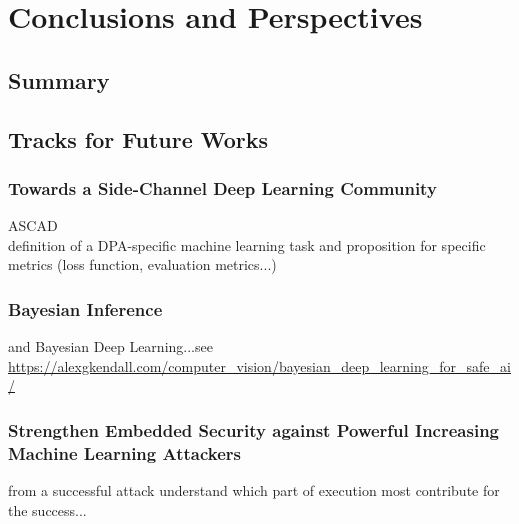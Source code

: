 
\chapter{Conclusions and Perspectives} %

\label{ChapterConclusions}



\section{Summary}

\section{Tracks for Future Works}
\subsection{Towards a Side-Channel Deep Learning Community}
ASCAD\\
definition of a DPA-specific machine learning task and proposition for specific metrics (\eg loss function, evaluation metrics...)
\subsection{Bayesian Inference}
and Bayesian Deep Learning...see \url{https://alexgkendall.com/computer_vision/bayesian_deep_learning_for_safe_ai/}

\subsection{Strengthen Embedded Security against Powerful Increasing Machine Learning Attackers}
from a successful attack understand which part of execution most contribute for the success...

